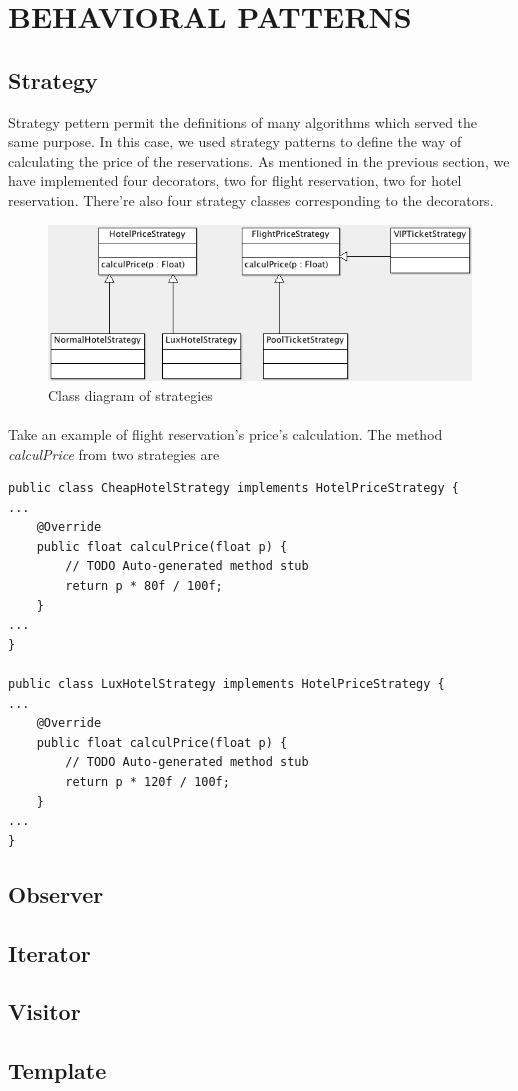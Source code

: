 \section{BEHAVIORAL PATTERNS}
\subsection{Strategy}
Strategy pettern permit the definitions of many algorithms which served the same purpose. In this case, we used strategy patterns to define the way of calculating the price of the reservations. As mentioned in the previous section, we have implemented four decorators, two for flight reservation, two for hotel reservation. There're also four strategy classes corresponding to the decorators.

\begin{figure}[h]
\centering
\includegraphics[width=12cm]{project/images/strategy.png}
\caption{Class diagram of strategies}
\end{figure}

\paragraph{}
Take an example of flight reservation's price's calculation. The method \textit{calculPrice} from two strategies are
\begin{lstlisting}
public class CheapHotelStrategy implements HotelPriceStrategy {
...
	@Override
	public float calculPrice(float p) {
		// TODO Auto-generated method stub
		return p * 80f / 100f;
	}
...
}

public class LuxHotelStrategy implements HotelPriceStrategy {
...
	@Override
	public float calculPrice(float p) {
		// TODO Auto-generated method stub
		return p * 120f / 100f;
	}
...
}
\end{lstlisting}

\subsection{Observer}


\subsection{Iterator}

\subsection{Visitor}

\subsection{Template}